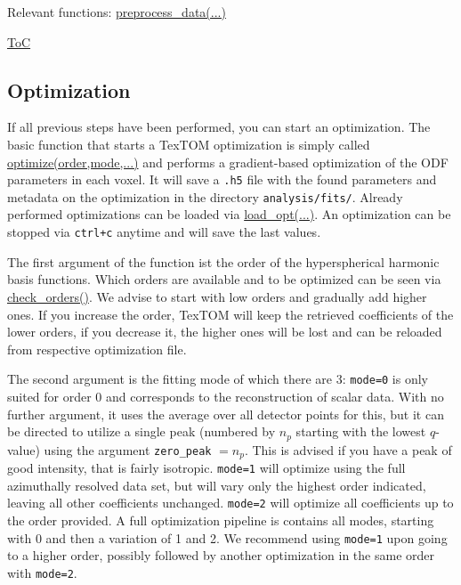 Relevant functions:
\hyperref[fun:preprocessdata]{preprocess\_data(...)}

\begin{flushright}
    \hyperref[toc]{ToC}
\end{flushright}

\subsection{Optimization}
If all previous steps have been performed, you can start an optimization.
The basic function that starts a TexTOM optimization is simply called \hyperref[fun:optimize]{optimize(order,mode,...)} and
performs a gradient-based optimization of the ODF parameters in each voxel.
It will save a \texttt{.h5} file with the found parameters and metadata on the optimization in the directory
\texttt{analysis/fits/}. Already performed optimizations can be loaded via \hyperref[fun:loadopt]{load\_opt(...)}.
An optimization can be stopped via \texttt{ctrl+c} anytime and will save the last values.

The first argument of the function ist the order of the hyperspherical harmonic basis functions. Which orders are
available and to be optimized can be seen via \hyperref[fun:checkorders]{check\_orders()}.
We advise to start with low orders and gradually add higher ones. If you increase the order, TexTOM will keep the
retrieved coefficients of the lower orders, if you decrease it, the higher ones will be lost and can be reloaded
from respective optimization file.

The second argument is the fitting mode of which there are 3: \texttt{mode=0} is only suited for order 0 and 
corresponds to the reconstruction of scalar data. With no further argument, it uses the average over all detector
points for this, but it can be directed to utilize a single peak (numbered by $n_p$ starting with the lowest $q$-value) 
using the argument \texttt{zero\_peak} $=n_p$. This is advised if you have a peak of good intensity, that is fairly isotropic.
\texttt{mode=1} will optimize using the full azimuthally resolved data set, but will vary only the highest order indicated, 
leaving all other coefficients unchanged.
\texttt{mode=2} will optimize all coefficients up to the order provided.
A full optimization pipeline is contains all modes, starting with 0 and then a variation of 1 and 2.
We recommend using \texttt{mode=1} upon going to a higher order, possibly followed by another optimization in the same
order with \texttt{mode=2}.

